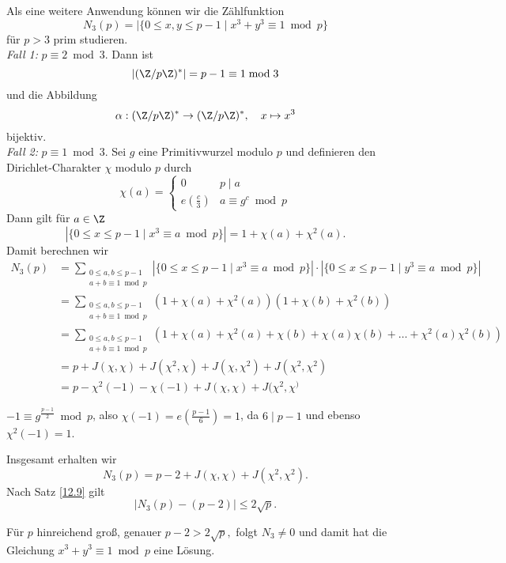 Als eine weitere Anwendung können wir die Zählfunktion
\[ N_3(p) = |\{0 \leq x,y \leq p-1 \mid x^3+y^3 \equiv 1 \bmod p\} \]
für $p>3$ prim studieren.\\
\emph{Fall 1:} $p \equiv 2 \bmod 3$. Dann ist
\[ |(\Z/p\Z)^*| = p-1 \equiv 1 \bmod 3 \]
und die Abbildung
\[ \alpha: (\Z/p\Z)^* \to (\Z/p\Z)^*,\quad x \mapsto x^3 \]
bijektiv.\\
\emph{Fall 2:} $p \equiv 1 \bmod 3$. Sei $g$ eine Primitivwurzel modulo $p$ und definieren den Dirichlet-Charakter $\chi$ modulo $p$ durch
\[ \chi(a) = \begin{cases}
	0 &p \mid a\\
	e\left( \frac{c}{3} \right) &a \equiv g^c \bmod p
\end{cases} \]
Dann gilt für $a \in \Z$
\[ |\{0 \leq x \leq p-1 \mid x^3 \equiv a \bmod p\}| = 1 + \chi(a) + \chi^2(a). \]
Damit berechnen wir
\begin{align*}
	N_3(p) &= \sum_{\substack{0 \leq a, b \leq p-1\\a + b \equiv 1 \bmod p}} |\{ 0 \leq x \leq p-1 \mid x^3 \equiv a \bmod p \}| \cdot |\{ 0 \leq x \leq p-1 \mid y^3 \equiv a \bmod p \}|\\
	&= \sum_{\substack{0 \leq a, b \leq p-1\\a + b \equiv 1 \bmod p}} (1 + \chi(a) + \chi^2(a))(1 + \chi(b) + \chi^2(b))\\
	&= \sum_{\substack{0 \leq a, b \leq p-1\\a + b \equiv 1 \bmod p}} (1 + \chi(a) + \chi^2(a) + \chi(b) + \chi(a)\chi(b) + \dots + \chi^2(a)\chi^2(b))\\
	&= p + J(\chi,\chi) + J(\chi^2,\chi) + J(\chi,\chi^2) + J(\chi^2,\chi^2)\\
	&= p - \chi^2(-1) - \chi(-1) + J(\chi,\chi) + J(\chi^2,\chi^)
\end{align*}

\begin{rem*}
	$-1 \equiv g^{\frac{p-1}{2}} \bmod p$, also $\chi(-1) = e\left( \frac{p-1}{6} \right) = 1$, da $6 \mid p-1$ und ebenso $\chi^2(-1) = 1$.
\end{rem*}

Insgesamt erhalten wir
\[ N_3(p) = p-2 + J(\chi,\chi) + J(\chi^2,\chi^2). \]
Nach Satz \ref{12.9} gilt
\[ |N_3(p) - (p-2)| \leq 2 \sqrt{p}. \]

\begin{rem*}
	Für $p$ hinreichend groß, genauer $p-2 > 2\sqrt{p},$ folgt $N_3 \neq 0$ und damit hat die Gleichung $x^3+y^3 \equiv 1 \bmod p$ eine Lösung.
\end{rem*}